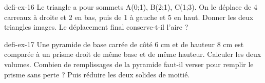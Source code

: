 \begin{blocEdition}{defi-ex-16}
Le triangle a pour sommets A(0;1), B(2;1), C(1;3). On le déplace de 4 carreaux à droite et 2 en bas, puis de 1 à gauche et 5 en haut. Donner les deux triangles images. Le déplacement final conserve-t-il l’aire ?\label{fig-defi-16}
\par{}\par\par{}\par{}\par{}\par{}\par{}\par{}
\end{blocEdition}
\begin{blocEdition}{defi-ex-17}
Une pyramide de base carrée de côté 6 cm et de hauteur 8 cm est comparée à un prisme droit de même base et de même hauteur. Calculer les deux volumes. Combien de remplissages de la pyramide faut-il verser pour remplir le prisme sans perte ? Puis réduire les deux solides de moitié.\label{fig-defi-17}
\par{}\par\par{}\par{}\par{}\par{}\par{}\par{}
\end{blocEdition}
